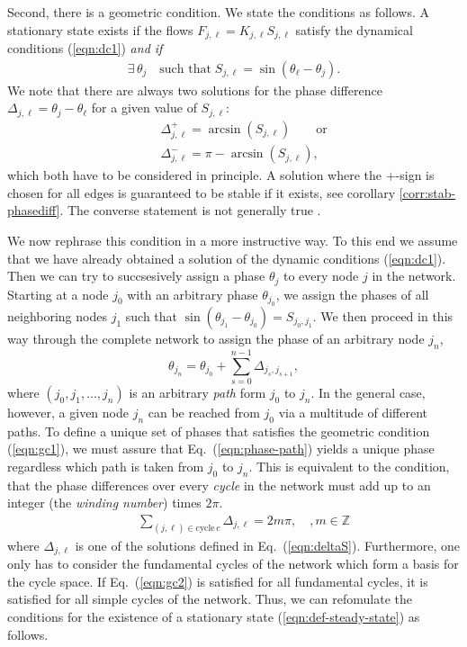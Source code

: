 \documentclass[10pt,aps,pre,preprint,superscriptaddress]{revtex4-1}
\newcommand{\be}{\begin{equation}}
\newcommand{\ee}{\end{equation}}
\newcommand{\bea}{\begin{eqnarray}}
\newcommand{\eea}{\end{eqnarray}}
\newcommand{\nn}{\nonumber}
\begin{document}
Second, there is a geometric condition.  We state the conditions as follows.
A stationary state exists if the flows 
$F_{j,\ell} = K_{j,\ell} S_{j,\ell}$
satisfy the dynamical conditions (\ref{eqn:dc1}) 
\emph{and if}  
\bea
    \exists \, \theta_j \quad \mbox{such that}  \;
    S_{j,\ell} = \sin(\theta_\ell - \theta_j).
  \label{eqn:gc1}
\eea
We note that there are always two solutions for the phase 
difference $\Delta_{j,\ell} = \theta_j - \theta_\ell$ 
for a given value of $S_{j,\ell}$:
\bea
     && \Delta_{j,\ell}^+ = \arcsin(S_{j,\ell}) 
      \qquad \mbox{or} \nn \\
    && \Delta_{j,\ell}^- = \pi -  \arcsin(S_{j,\ell}),
     \label{eqn:deltaS} 
\eea
which both have to be considered in principle. A solution
where the $+$-sign is chosen for all edges is guaranteed 
to be stable if it exists, see corollary \ref{corr:stab-phasediff}.
The converse statement is not generally true \cite{14bifurcation}.

We now rephrase this condition in a more instructive way.
To this end we assume that we have already obtained a solution
of the dynamic conditions (\ref{eqn:dc1}). Then we can try to
succsesively assign a phase $\theta_j$ to every node $j$ in the
network. Starting at a node $j_0$ with an arbitrary phase
$\theta_{j_0}$, we assign the phases of all neighboring nodes
$j_1$ such that $\sin(\theta_{j_1}   -   \theta_{j_0}) = S_{j_0,j_1}$.
We then proceed in this way through the complete network
to assign the phase of an arbitrary node $j_n$,
\be
   \theta_{j_n} = \theta_{j_0} + \sum_{s=0}^{n-1}
      \Delta_{j_s,j_{s+1}},
   \label{eqn:phase-path}
\ee
where $(j_0,j_1,\ldots,j_n)$ is an arbitrary \emph{path} form
$j_0$ to $j_n$. 
In the general case, however, a given node $j_n$ can be reached
from $j_0$ via a multitude of different paths. To define a unique
set of phases that satisfies the geometric condition (\ref{eqn:gc1}),
we must assure that Eq.~(\ref{eqn:phase-path}) yields a unique 
phase regardless which path is taken from $j_0$ to $j_n$.
This is equivalent to the condition, that the phase 
differences over every \emph{cycle} in the network 
must add up to an integer (the \emph{winding number}) times $2\pi$.  
\bea
       \label{eqn:gc2}
    && \sum_{(j,\ell) \in \text{cycle} \, c} \Delta_{j,\ell} = 2 m \pi,\quad, m\in\mathbb{Z}
\eea
where $\Delta_{j,\ell}$ is one of the solutions defined in 
Eq.~(\ref{eqn:deltaS}). 
Furthermore, one only has to consider the fundamental
cycles of the network which form a basis for the cycle space.
If Eq.~(\ref{eqn:gc2}) is satisfied for all fundamental cycles, it is 
satisfied for all simple cycles of the network.
Thus, we can refomulate the conditions for the
existence of a stationary state (\ref{eqn:def-steady-state}) 
as follows.
\end{document}
